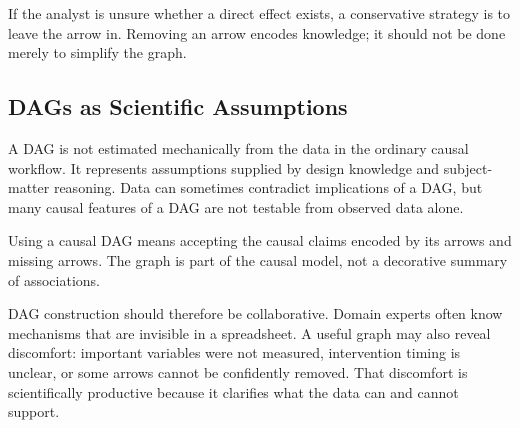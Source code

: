 If the analyst is unsure whether a direct effect exists, a conservative strategy is to leave the arrow in. Removing an arrow encodes knowledge; it should not be done merely to simplify the graph.

\subsection{DAGs as Scientific Assumptions}

A DAG is not estimated mechanically from the data in the ordinary causal workflow. It represents assumptions supplied by design knowledge and subject-matter reasoning. Data can sometimes contradict implications of a DAG, but many causal features of a DAG are not testable from observed data alone.

\begin{assumptionbox}
Using a causal DAG means accepting the causal claims encoded by its arrows and missing arrows. The graph is part of the causal model, not a decorative summary of associations.
\end{assumptionbox}

DAG construction should therefore be collaborative. Domain experts often know mechanisms that are invisible in a spreadsheet. A useful graph may also reveal discomfort: important variables were not measured, intervention timing is unclear, or some arrows cannot be confidently removed. That discomfort is scientifically productive because it clarifies what the data can and cannot support.
